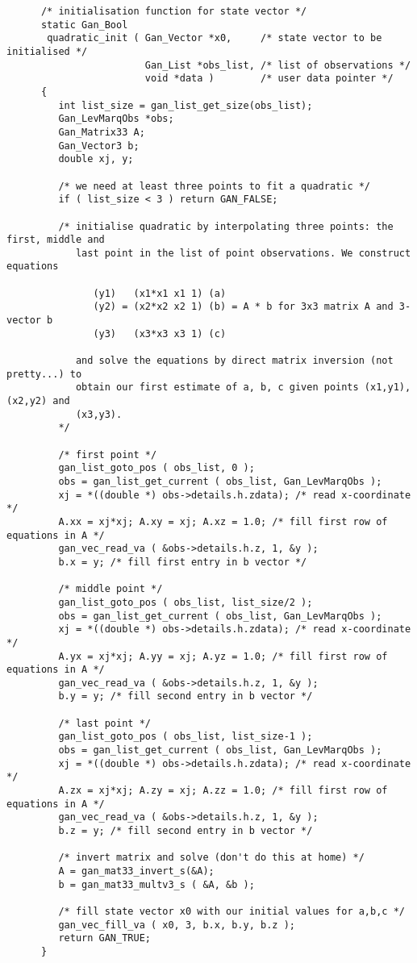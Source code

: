 \begin{verbatim}
      /* initialisation function for state vector */
      static Gan_Bool
       quadratic_init ( Gan_Vector *x0,     /* state vector to be initialised */
                        Gan_List *obs_list, /* list of observations */
                        void *data )        /* user data pointer */
      {
         int list_size = gan_list_get_size(obs_list);
         Gan_LevMarqObs *obs;
         Gan_Matrix33 A;
         Gan_Vector3 b;
         double xj, y;

         /* we need at least three points to fit a quadratic */
         if ( list_size < 3 ) return GAN_FALSE;

         /* initialise quadratic by interpolating three points: the first, middle and
            last point in the list of point observations. We construct equations
      
               (y1)   (x1*x1 x1 1) (a)
               (y2) = (x2*x2 x2 1) (b) = A * b for 3x3 matrix A and 3-vector b
               (y3)   (x3*x3 x3 1) (c)

            and solve the equations by direct matrix inversion (not pretty...) to
            obtain our first estimate of a, b, c given points (x1,y1), (x2,y2) and
            (x3,y3).
         */

         /* first point */
         gan_list_goto_pos ( obs_list, 0 );
         obs = gan_list_get_current ( obs_list, Gan_LevMarqObs );
         xj = *((double *) obs->details.h.zdata); /* read x-coordinate */
         A.xx = xj*xj; A.xy = xj; A.xz = 1.0; /* fill first row of equations in A */
         gan_vec_read_va ( &obs->details.h.z, 1, &y );
         b.x = y; /* fill first entry in b vector */
    
         /* middle point */
         gan_list_goto_pos ( obs_list, list_size/2 );
         obs = gan_list_get_current ( obs_list, Gan_LevMarqObs );
         xj = *((double *) obs->details.h.zdata); /* read x-coordinate */
         A.yx = xj*xj; A.yy = xj; A.yz = 1.0; /* fill first row of equations in A */
         gan_vec_read_va ( &obs->details.h.z, 1, &y );
         b.y = y; /* fill second entry in b vector */
    
         /* last point */
         gan_list_goto_pos ( obs_list, list_size-1 );
         obs = gan_list_get_current ( obs_list, Gan_LevMarqObs );
         xj = *((double *) obs->details.h.zdata); /* read x-coordinate */
         A.zx = xj*xj; A.zy = xj; A.zz = 1.0; /* fill first row of equations in A */
         gan_vec_read_va ( &obs->details.h.z, 1, &y );
         b.z = y; /* fill second entry in b vector */

         /* invert matrix and solve (don't do this at home) */
         A = gan_mat33_invert_s(&A);
         b = gan_mat33_multv3_s ( &A, &b );

         /* fill state vector x0 with our initial values for a,b,c */
         gan_vec_fill_va ( x0, 3, b.x, b.y, b.z );
         return GAN_TRUE;
      }
\end{verbatim}
